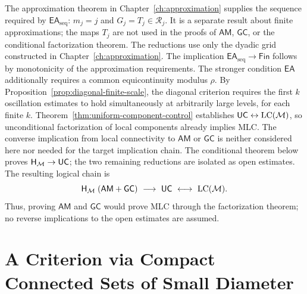 The approximation theorem in Chapter~\ref{ch:approximation} supplies the
sequence required by \(\mathsf{EA}_{\mathrm{seq}}\): \(m_j=j\) and
\(G_j=T_j\in\mathcal R_j\). It is a separate result about finite
approximations; the maps \(T_j\) are not used in the proofs of
\(\mathsf{AM}\), \(\mathsf{GC}\), or the conditional factorization
theorem. The reductions use only the dyadic grid constructed in
Chapter~\ref{ch:approximation}. The implication
\(\mathsf{EA}_{\mathrm{seq}}\to\mathsf{Fin}\) follows by
monotonicity of the approximation requirements. The stronger condition
\(\mathsf{EA}\) additionally requires a common equicontinuity modulus
\(\rho\). By Proposition~\ref{prop:diagonal-finite-scale}, the diagonal
criterion requires the first \(k\) oscillation estimates to hold
simultaneously at arbitrarily large levels, for each finite \(k\).
Theorem~\ref{thm:uniform-component-control} establishes
\(\mathsf{UC}\leftrightarrow\operatorname{LC}(\mathcal M)\), so unconditional factorization
of local components already implies MLC. The converse implication from
local connectivity to \(\mathsf{AM}\) or \(\mathsf{GC}\) is neither
considered here nor needed for the target implication chain. The
conditional theorem below proves \(\mathsf H_{\mathcal M}\to\mathsf{UC}\);
the two remaining reductions are isolated as open estimates. The
resulting logical chain is
\[
 \mathsf H_{\mathcal M}\;(\mathsf{AM}+\mathsf{GC})
 \ \longrightarrow\ \mathsf{UC}
 \ \longleftrightarrow\ \operatorname{LC}(\mathcal M).
\]
Thus, proving \(\mathsf{AM}\) and \(\mathsf{GC}\) would prove MLC through
the factorization theorem; no reverse implications to the open
estimates are assumed.

\section{A Criterion via Compact Connected Sets of Small Diameter}

